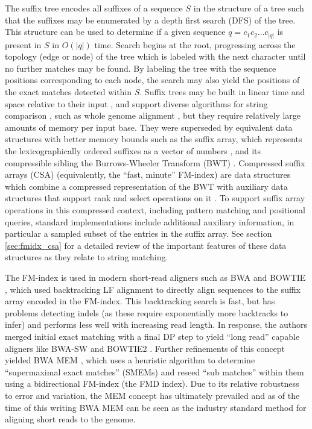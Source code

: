 The suffix tree \cite{weiner1973linear} encodes all suffixes of a sequence $S$ in the structure of a tree such that the suffixes may be enumerated by a depth first search (DFS) of the tree.
This structure can be used to determine if a given sequence $q = c_{1}c_{2}\ldots c_{|q|}$ is present in $S$ in $O(|q|)$ time.
Search begins at the root, progressing across the topology (edge or node) of the tree which is labeled with the next character until no further matches may be found.
By labeling the tree with the sequence positions corresponding to each node, the search may also yield the positions of the exact matches detected within $S$.
Suffix trees may be built in linear time and space relative to their input \cite{ukkonen1995line}, and support diverse algorithms for string comparison \cite{apostolico1985myriad}, such as whole genome alignment \cite{delcher1999alignment}, but they require relatively large amounts of memory per input base.
They were superseded by equivalent data structures with better memory bounds such as the suffix array, which represents the lexicographically ordered suffixes as a vector of numbers \cite{manber1993suffix}, and its compressible sibling the Burrows-Wheeler Transform (BWT) \cite{burrows1994block}.
Compressed suffix arrays (CSA) (equivalently, the ``fast, minute'' FM-index) are data structures which combine a compressed representation of the BWT with auxiliary data structures that support rank and select operations on it \cite{ferragina2000opportunistic,ferragina2004alphabet,grossi2005compressed}.
To support suffix array operations in this compressed context, including pattern matching and positional queries, standard implementations include additional auxiliary information, in particular a sampled subset of the entries in the suffix array.
See section \ref{sec:fmidx_csa} for a detailed review of the important features of these data structures as they relate to string matching.

The FM-index is used in modern short-read aligners such as BWA \cite{li2009fast} and BOWTIE \cite{langmead2009ultrafast}, which used backtracking LF alignment to directly align sequences to the suffix array encoded in the FM-index.
This backtracking search is fast, but has problems detecting indels (as these require exponentially more backtracks to infer) and performs less well with increasing read length.
In response, the authors merged initial exact matching with a final DP step to yield ``long read'' capable aligners like BWA-SW \cite{li2010fast} and BOWTIE2 \cite{langmead2012fast}.
Further refinements of this concept yielded BWA MEM \cite{li2013aligning}, which uses a heuristic algorithm to determine ``supermaximal exact matches'' (SMEMs) and reseed ``sub matches'' within them using a bidirectional FM-index (the FMD index).
Due to its relative robustness to error and variation, the MEM concept has ultimately prevailed and as of the time of this writing BWA MEM can be seen as the industry standard method for aligning short reads to the genome.


